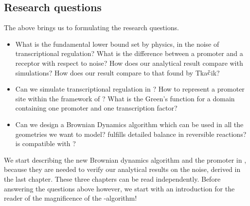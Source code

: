 \subsection{Research questions}
The above brings us to formulating the research questions.
\begin{itemize}
 \item What is the fundamental lower bound set by physics, in the noise of transcriptional regulation?
 \subitem What is the difference between a promoter and a receptor with respect to noise?
 \subitem How does our analytical result compare with simulations? 
 \subitem How does our result compare to that found by Tka$\check{\rm c}$ik?

 \item Can we simulate transcriptional regulation in \GFRD ?
 \subitem How to represent a promoter site within the framework of \GFRD?
 \subitem What is the Green's function for a domain containing one promoter and one transcription factor?
 
 \item Can we design a Brownian Dynamics algorithm which
 \subitem can be used in all the geometries we want to model?
 \subitem fulfills detailed balance in reversible reactions?
 \subitem is compatible with \GFRD ?
\end{itemize}
We start describing the new Brownian dynamics algorithm and the promoter in \GFRD, because they are needed to verify our analytical results on the noise, derived in the last chapter. These three chapters can be read independently. Before answering the questions above however, we start with an introduction for the reader of the magnificence of the \GFRD -algorithm!










